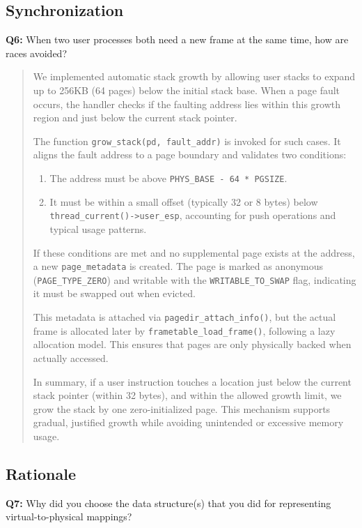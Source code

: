 \documentclass[a4paper,11pt]{paper}
\begin{document}
\subsection{Synchronization}

\textbf{Q6:} When two user processes both need a new frame at the same time, how are races avoided?

\begin{quote}
We implemented automatic stack growth by allowing user stacks to expand up to 256KB (64 pages) below the initial stack base. When a page fault occurs, the handler checks if the faulting address lies within this growth region and just below the current stack pointer.

The function \texttt{grow\_stack(pd, fault\_addr)} is invoked for such cases. It aligns the fault address to a page boundary and validates two conditions:
\begin{enumerate}
    \item The address must be above \texttt{PHYS\_BASE - 64 * PGSIZE}.
    \item It must be within a small offset (typically 32 or 8 bytes) below \texttt{thread\_current()->user\_esp}, accounting for push operations and typical usage patterns.
\end{enumerate}

If these conditions are met and no supplemental page exists at the address, a new \texttt{page\_metadata} is created. The page is marked as anonymous (\texttt{PAGE\_TYPE\_ZERO}) and writable with the \texttt{WRITABLE\_TO\_SWAP} flag, indicating it must be swapped out when evicted.

This metadata is attached via \texttt{pagedir\_attach\_info()}, but the actual frame is allocated later by \texttt{frametable\_load\_frame()}, following a lazy allocation model. This ensures that pages are only physically backed when actually accessed.

In summary, if a user instruction touches a location just below the current stack pointer (within 32 bytes), and within the allowed growth limit, we grow the stack by one zero-initialized page. This mechanism supports gradual, justified growth while avoiding unintended or excessive memory usage.

\end{quote}

\subsection{Rationale}
\textbf{Q7:} Why did you choose the data structure(s) that you did for representing virtual-to-physical mappings?
\end{document}
